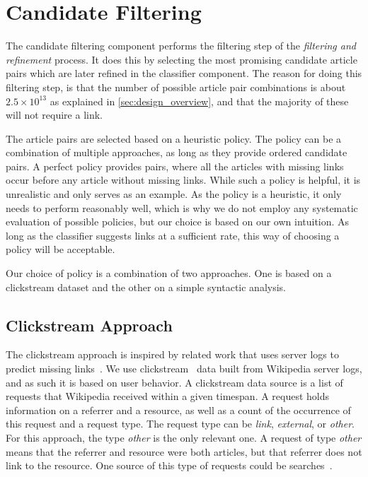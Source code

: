 \section{Candidate Filtering}
The candidate filtering component performs the filtering step of the \emph{filtering and refinement} process. It does this by selecting the most promising candidate article pairs which are later refined in the classifier component. The reason for doing this filtering step, is that the number of possible article pair combinations is about $2.5 \times 10^{13}$ as explained in \cref{sec:design_overview}, and that the majority of these will not require a link.

The article pairs are selected based on a heuristic policy. The policy can be a combination of multiple approaches, as long as they provide ordered candidate pairs. A perfect policy provides pairs, where all the articles with missing links occur before any article without missing links. While such a policy is helpful, it is unrealistic and only serves as an example. As the policy is a heuristic, it only needs to perform reasonably well, which is why we do not employ any systematic evaluation of possible policies, but our choice is based on our own intuition. As long as the classifier suggests links at a sufficient rate, this way of choosing a policy will be acceptable.

Our choice of policy is a combination of two approaches. One is based on a clickstream dataset and the other on a simple syntactic analysis.

\subsection{Clickstream Approach}

The clickstream approach is inspired by related work that uses server logs to predict missing links~\cite{hyperlink-structure-using-logs}. We use clickstream~\cite{wiki-clickstream} data built from Wikipedia server logs, and as such it is based on user behavior. A clickstream data source is a list of requests that Wikipedia received within a given timespan. A request holds information on a referrer and a resource, as well as a count of the occurrence of this request and a request type. The request type can be \emph{link}, \emph{external}, or \emph{other}. For this approach, the type \emph{other} is the only relevant one. A request of type \emph{other} means that the referrer and resource were both articles, but that referrer does not link to the resource. One source of this type of requests could be searches~\cite{wiki-clickstream}. 

